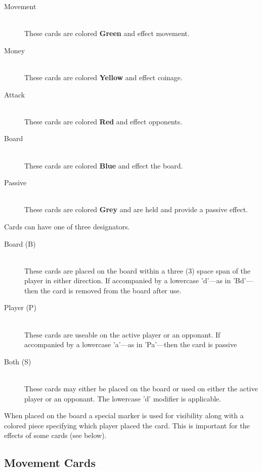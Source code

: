 \documentclass{article}
\begin{document}
\begin{description}
\item[Movement]~\\
These cards are colored \textbf{Green} and effect movement.

\item[Money]~\\
These cards are colored \textbf{Yellow} and effect coinage.

\item[Attack]~\\
These cards are colored \textbf{Red} and effect opponents.

\item[Board]~\\
These cards are colored \textbf{Blue} and effect the board.

\item[Passive]~\\
These cards are colored \textbf{Grey} and are held and provide
a passive effect.
\end{description}

\noindent
Cards can have one of three designators.

\begin{description}
\item[Board (B)]~\\
These cards are placed on the board within a three (3) space span
of the player in either direction.  If accompanied by a lowercase
'd'---as in 'Bd'---then the card is removed from the board after use.

\item[Player (P)]~\\
These cards are useable on the active player or an opponant.
If accompanied by a lowercase 'a'---as in 'Pa'---then the card is passive

\item[Both (S)]~\\
These cards may either be placed on the board or used on either
the active player or an opponant. The lowercase 'd' modifier is applicable.
\end{description}


\noindent
When placed on the board a special marker is used for visibility along with a
colored piece specifying which player placed the card.  This is important for
the effects of some cards (see below).

\subsection{Movement Cards}
\end{document}
